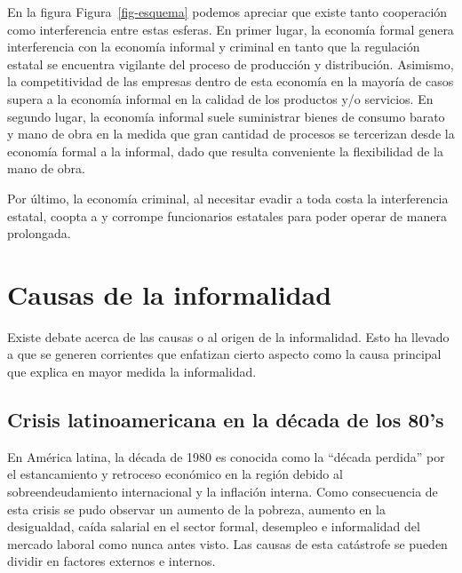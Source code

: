 \documentclass[
  letterpaper,
  12pt,
  oneside,
  spanish,
  doublespacing,
  headsepline,
  parskip]{MastersDoctoralThesis}
\begin{document}
En la figura Figura~\ref{fig-esquema} podemos apreciar que existe tanto
cooperación como interferencia entre estas esferas. En primer lugar, la
economía formal genera interferencia con la economía informal y criminal
en tanto que la regulación estatal se encuentra vigilante del proceso de
producción y distribución. Asimismo, la competitividad de las empresas
dentro de esta economía en la mayoría de casos supera a la economía
informal en la calidad de los productos y/o servicios. En segundo lugar,
la economía informal suele suministrar bienes de consumo barato y mano
de obra en la medida que gran cantidad de procesos se tercerizan desde
la economía formal a la informal, dado que resulta conveniente la
flexibilidad de la mano de obra.

Por último, la economía criminal, al necesitar evadir a toda costa la
interferencia estatal, coopta a y corrompe funcionarios estatales para
poder operar de manera prolongada.

\hypertarget{causas-de-la-informalidad}{%
\section{Causas de la informalidad}\label{causas-de-la-informalidad}}

Existe debate acerca de las causas o al origen de la informalidad. Esto
ha llevado a que se generen corrientes que enfatizan cierto aspecto como
la causa principal que explica en mayor medida la informalidad.

\hypertarget{crisis-latinoamericana-en-la-duxe9cada-de-los-80s}{%
\subsection{Crisis latinoamericana en la década de los
80's}\label{crisis-latinoamericana-en-la-duxe9cada-de-los-80s}}

En América latina, la década de 1980 es conocida como la ``década
perdida'' por el estancamiento y retroceso económico en la región debido
al sobreendeudamiento internacional y la inflación interna. Como
consecuencia de esta crisis se pudo observar un aumento de la pobreza,
aumento en la desigualdad, caída salarial en el sector formal, desempleo
e informalidad del mercado laboral como nunca antes visto. Las causas de
esta catástrofe se pueden dividir en factores externos e internos.
\end{document}
